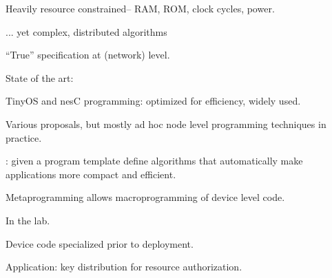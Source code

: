 
\begin{citemize}
\item Heavily resource constrained-- RAM, ROM, clock cycles, power.
\item ... yet complex, distributed algorithms
\begin{citemize}
\item ``True'' specification at  (network) level.
\end{citemize}
\end{citemize}
State of the art:
\begin{citemize}
\item TinyOS and nesC programming: optimized for efficiency, widely used.
\item Various  proposals, but mostly ad hoc 
node level programming techniques in practice.
\end{citemize}
\stopslide


\begin{citemize}
\item {}: given a program template define algorithms that 
automatically make applications more compact and efficient.
\item Metaprogramming allows macroprogramming of device level code.
\end{citemize}

\stopslide


\vspace{.4in}
\begin{center}
\end{center}

In the lab.
\begin{citemize}
\item Device code specialized prior to deployment.
\item Application: key distribution for resource authorization.
\end{citemize}

\stopslide



$$
\begin{array}{l@{\qquad}l}
&
\end{array}
$$


